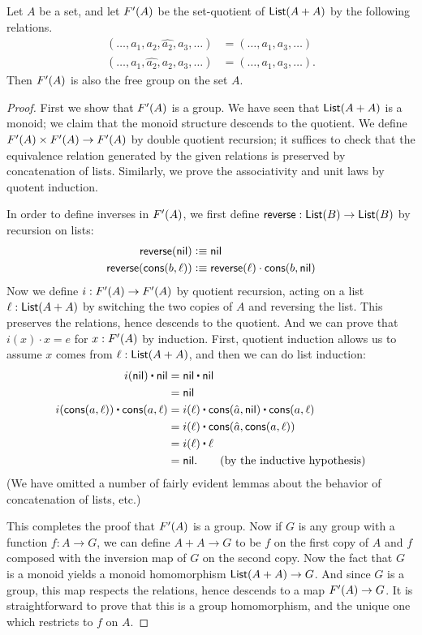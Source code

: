 \begin{thm}
  Let $A$ be a set, and let $F'(A)$ be the set-quotient of $\mathsf{List}(A+A)$ by the following relations.
  \begin{align*}
    (\dots,a_1,a_2,\widehat{a_2},a_3,\dots) &=
    (\dots,a_1,a_3,\dots)\\
    (\dots,a_1,\widehat{a_2},a_2,a_3,\dots) &=
    (\dots,a_1,a_3,\dots).
  \end{align*}
  Then $F'(A)$ is also the free group on the set $A$.
\end{thm}
\begin{proof}
  First we show that $F'(A)$ is a group.
  We have seen that $\mathsf{List}(A+A)$ is a monoid; we claim that the monoid structure descends to the quotient.
  We define $F'(A) \times F'(A) \to F'(A)$ by double quotient recursion; it suffices to check that the equivalence relation generated by the given relations is preserved by concatenation of lists.
  Similarly, we prove the associativity and unit laws by quotent induction.

  In order to define inverses in $F'(A)$, we first define $\mathsf{reverse}:\mathsf{List}(B)\to\mathsf{List}(B)$ by recursion on lists:
  \begin{align*}
    \mathsf{reverse}(\mathsf{nil}) &\vcentcolon\equiv \mathsf{nil}\\
    \mathsf{reverse}(\mathsf{cons}(b,\ell))&\vcentcolon\equiv \mathsf{reverse}(\ell)\cdot \mathsf{cons}(b,\mathsf{nil})
  \end{align*}
  Now we define $i:F'(A)\to F'(A)$ by quotient recursion, acting on a list $\ell:\mathsf{List}(A+A)$ by switching the two copies of $A$ and reversing the list.
  This preserves the relations, hence descends to the quotient.
  And we can prove that $i(x) \cdot x = e$ for $x:F'(A)$ by induction.
  First, quotient induction allows us to assume $x$ comes from $\ell:\mathsf{List}(A+A)$, and then we can do list induction:
  \begin{align*}
    i(\nil) \ct \nil &= \nil \ct \nil\\
    &= \nil\\
    i(\cons(a,\ell)) \ct \cons(a,\ell) &= i(\ell) \ct \cons(\hat{a},\nil) \ct \cons(a,\ell)\\
    &= i(\ell) \ct \cons(\hat{a},\cons(a,\ell))\\
    &= i(\ell) \ct \ell\\
    &= \nil. \tag{by the inductive hypothesis}
  \end{align*}
  (We have omitted a number of fairly evident lemmas about the behavior of concatenation of lists, etc.)

  This completes the proof that $F'(A)$ is a group.
  Now if $G$ is any group with a function $f:A\to G$, we can define $A+A\to G$ to be $f$ on the first copy of $A$ and $f$ composed with the inversion map of $G$ on the second copy.
  Now the fact that $G$ is a monoid yields a monoid homomorphism $\mathsf{List}(A+A) \to G$.
  And since $G$ is a group, this map respects the relations, hence descends to a map $F'(A)\to G$.
  It is straightforward to prove that this is a group homomorphism, and the unique one which restricts to $f$ on $A$.
\end{proof}

